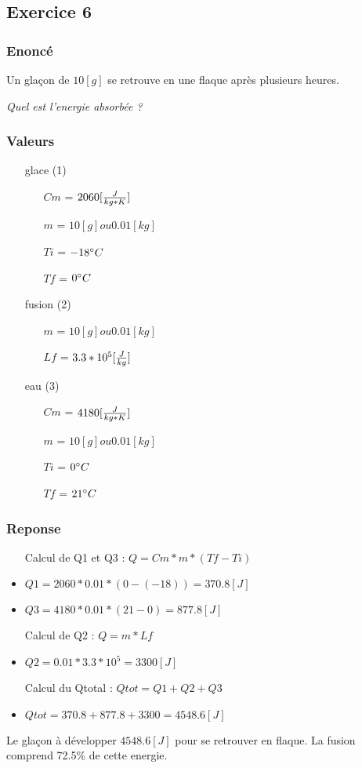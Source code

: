 
\subsection{Exercice 6}
\subsubsection{Enoncé}

Un glaçon de $10[g]$ se retrouve en une flaque après plusieurs heures.

\textit{Quel est l'energie absorbée ?}
\subsubsection{Valeurs}
\begin{itemize}
    \item[glace] (1)
    \item[] 
    \begin{itemize}
        \item[$Cm$] = $2060[\cm]$
        \item[$m$] = $10[g] ou 0.01[kg]$
        \item[$Ti$] = $-18\celsius$
        \item[$Tf$] = $0\celsius$  
    \end{itemize}
    \item[fusion] (2)
    \item[] 
    \begin{itemize}
        \item[$m$] = $10[g] ou 0.01[kg]$
        \item[$Lf$] = $3.3 * 10^5[\lf]$
    \end{itemize} 
    \item[eau] (3)
    \item[] 
    \begin{itemize}
        \item[$Cm$] = $4180[\cm]$
        \item[$m$] = $10[g] ou 0.01[kg]$
        \item[$Ti$] = $0\celsius$
        \item[$Tf$] = $21\celsius$  
    \end{itemize}
\end{itemize}
\subsubsection{Reponse}
\begin{itemize}
    \item[Calcul de Q1 et Q3] : $Q = Cm * m * (Tf-Ti)$
    \item $Q1 = 2060 * 0.01 * (0-(-18)) = 370.8[J]$
    \item $Q3 = 4180 * 0.01 * (21-0) = 877.8[J]$
    \item[Calcul de Q2] : $Q = m * Lf$
    \item $Q2 = 0.01 * 3.3*10^5 = 3300[J]$  
    \item[Calcul du Qtotal] : $Qtot = Q1+ Q2+Q3$
    \item $Qtot = 370.8 + 877.8 + 3300 = 4548.6 [J]$  
\end{itemize}
Le glaçon à développer $4548.6[J]$ pour se retrouver en flaque.
La fusion comprend 72.5\% de cette energie.
